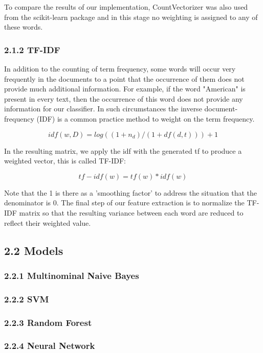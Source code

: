 \documentclass{neu_handout}
\begin{document}
To compare the results of our implementation, CountVectorizer was also used from the scikit-learn package and in this stage no weighting is assigned to any of these words.


\subsubsection*{2.1.2 TF-IDF}
In addition to the counting of term frequency, some words will occur very frequently in the documents to a point that the occurrence of them does not provide much additional information. For example, if the word "American" is present in every text, then the occurrence of this word does not provide any information for our classifier. In such circumstances the inverse document-frequency (IDF) is a common practice method to weight on the term frequency.

$$idf(w,D)=log((1+n_d)/(1+df(d,t)))+1$$

In the resulting matrix, we apply the idf with the generated tf to produce a weighted vector, this is called TF-IDF:

$$tf-idf(w)=tf(w)*idf(w)$$

Note that the 1 is there as a 'smoothing factor' to address the situation that the denominator is 0. The final step of our feature extraction is to normalize the TF-IDF matrix so that the resulting variance between each word are reduced to reflect their weighted value.

\subsection*{2.2 Models}

\subsubsection*{2.2.1 Multinominal Naive Bayes}



\subsubsection*{2.2.2 SVM}


\subsubsection*{2.2.3 Random Forest}
 
 
\subsubsection*{2.2.4 Neural Network}
\end{document}
